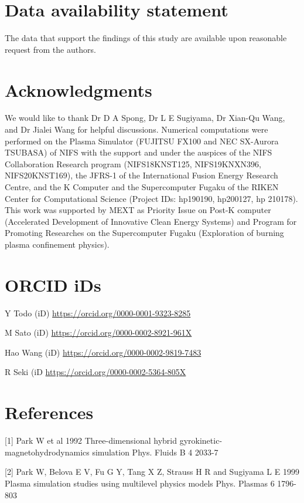 \documentclass[10pt]{article}
\begin{document}
\section{Data availability statement}
The data that support the findings of this study are available upon reasonable request from the authors.

\section{Acknowledgments}
We would like to thank Dr D A Spong, Dr L E Sugiyama, Dr Xian-Qu Wang, and Dr Jialei Wang for helpful discussions. Numerical computations were performed on the Plasma Simulator (FUJITSU FX100 and NEC SX-Aurora TSUBASA) of NIFS with the support and under the auspices of the NIFS Collaboration Research program (NIFS18KNST125, NIFS19KNXN396, NIFS20KNST169), the JFRS-1 of the International Fusion Energy Research Centre, and the K Computer and the Supercomputer Fugaku of the RIKEN Center for Computational Science (Project IDs: hp190190, hp200127, $\mathrm{hp}$ 210178). This work was supported by MEXT as Priority Issue on Post-K computer (Accelerated Development of Innovative Clean Energy Systems) and Program for Promoting Researches on the Supercomputer Fugaku (Exploration of burning plasma confinement physics).

\section{ORCID iDs}
Y Todo (iD) \href{https://orcid.org/0000-0001-9323-8285}{https://orcid.org/0000-0001-9323-8285}

M Sato (iD) \href{https://orcid.org/0000-0002-8921-961X}{https://orcid.org/0000-0002-8921-961X}

Hao Wang (iD) \href{https://orcid.org/0000-0002-9819-7483}{https://orcid.org/0000-0002-9819-7483}

R Seki (iD \href{https://orcid.org/0000-0002-5364-805X}{https://orcid.org/0000-0002-5364-805X}

\section{References}
[1] Park W et al 1992 Three-dimensional hybrid gyrokinetic-magnetohydrodynamics simulation Phys. Fluids B 4 2033-7

[2] Park W, Belova E V, Fu G Y, Tang X Z, Strauss H R and Sugiyama L E 1999 Plasma simulation studies using multilevel physics models Phys. Plasmas 6 1796-803
\end{document}
